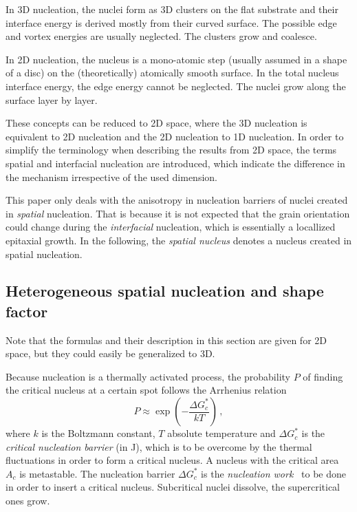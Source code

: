 In 3D nucleation, the nuclei form as 3D clusters on the flat substrate and their interface energy is derived mostly from their curved surface. The possible edge and vortex energies are usually neglected. The clusters grow and coalesce.

In 2D nucleation, the nucleus is a mono-atomic step (usually assumed in a shape of a disc) on the (theoretically) atomically smooth surface. In the total nucleus interface energy, the edge energy cannot be neglected. The nuclei grow along the surface layer by layer. 

These concepts can be reduced to 2D space, where the 3D nucleation is equivalent to 2D nucleation and the 2D nucleation to 1D nucleation. In order to simplify the terminology when describing the results from 2D space, the terms spatial and interfacial nucleation are introduced, which indicate the difference in the mechanism irrespective of the used dimension.

This paper only deals with the anisotropy in nucleation barriers of nuclei created in \textit{spatial} nucleation. That is because it is not expected that the grain orientation could change during the \textit{interfacial} nucleation, which is essentially a locallized epitaxial growth. In the following, the \textit{spatial nucleus} denotes a nucleus created in spatial nucleation.

\subsection{Heterogeneous spatial nucleation and shape factor}    
Note that the formulas and their description in this section are given for 2D space, but they could easily be generalized to 3D. 

Because nucleation is a thermally activated process, the probability $P$ of finding the critical nucleus at a certain spot follows the Arrhenius relation
\begin{equation}
	P \approx \exp\left(-\frac{\Delta G_c^*}{kT}\right) \,,
\end{equation}
where $k$ is the Boltzmann constant, $T$ absolute temperature and $\Delta G_c^*$ is the \textit{critical nucleation barrier} (in J), which is to be overcome by the thermal fluctuations in order to form a critical nucleus. A nucleus with the critical area $A_c$ is metastable. The nucleation barrier $\Delta G_c^*$ is the \textit{nucleation work}~\cite{Milchev2002} to be done in order to insert a critical nucleus. Subcritical nuclei dissolve, the supercritical ones grow.

